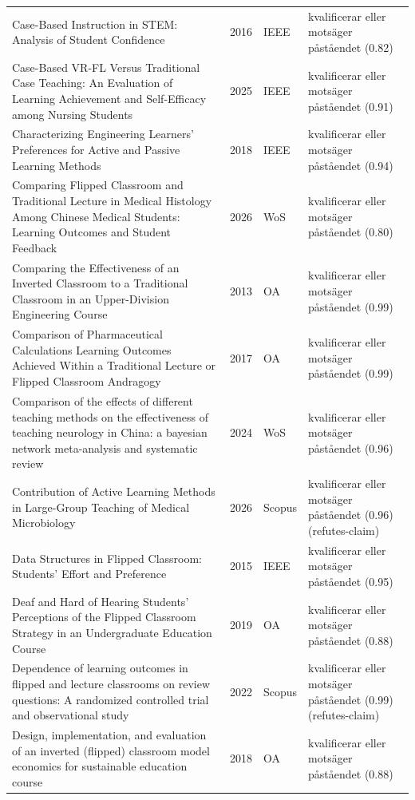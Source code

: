 \begin{longtable}{@{}%
  >{\raggedright\arraybackslash}p{}c%
  >{\raggedright\arraybackslash}p{}%
  >{\raggedright\arraybackslash}p{}@{}}
Case-Based Instruction in STEM: Analysis of Student Confidence & 2016 & IEEE & kvalificerar eller motsäger påståendet (0.82) \\
Case-Based VR-FL Versus Traditional Case Teaching: An Evaluation of Learning Achievement and Self-Efficacy among Nursing Students & 2025 & IEEE & kvalificerar eller motsäger påståendet (0.91) \\
Characterizing Engineering Learners' Preferences for Active and Passive Learning Methods & 2018 & IEEE & kvalificerar eller motsäger påståendet (0.94) \\
Comparing Flipped Classroom and Traditional Lecture in Medical Histology Among Chinese Medical Students: Learning Outcomes and Student Feedback & 2026 & WoS & kvalificerar eller motsäger påståendet (0.80) \\
Comparing the Effectiveness of an Inverted Classroom to a Traditional Classroom in an Upper-Division Engineering Course & 2013 & OA & kvalificerar eller motsäger påståendet (0.99) \\
Comparison of Pharmaceutical Calculations Learning Outcomes Achieved Within a Traditional Lecture or Flipped Classroom Andragogy & 2017 & OA & kvalificerar eller motsäger påståendet (0.99) \\
Comparison of the effects of different teaching methods on the effectiveness of teaching neurology in China: a bayesian network meta-analysis and systematic review & 2024 & WoS & kvalificerar eller motsäger påståendet (0.96) \\
Contribution of Active Learning Methods in Large-Group Teaching of Medical Microbiology & 2026 & Scopus & kvalificerar eller motsäger påståendet (0.96) (refutes-claim) \\
Data Structures in Flipped Classroom: Students' Effort and Preference & 2015 & IEEE & kvalificerar eller motsäger påståendet (0.95) \\
Deaf and Hard of Hearing Students' Perceptions of the Flipped Classroom Strategy in an Undergraduate Education Course & 2019 & OA & kvalificerar eller motsäger påståendet (0.88) \\
Dependence of learning outcomes in flipped and lecture classrooms on review questions: A randomized controlled trial and observational study & 2022 & Scopus & kvalificerar eller motsäger påståendet (0.99) (refutes-claim) \\
Design, implementation, and evaluation of an inverted (flipped) classroom model economics for sustainable education course & 2018 & OA & kvalificerar eller motsäger påståendet (0.88) \\

\end{longtable}
